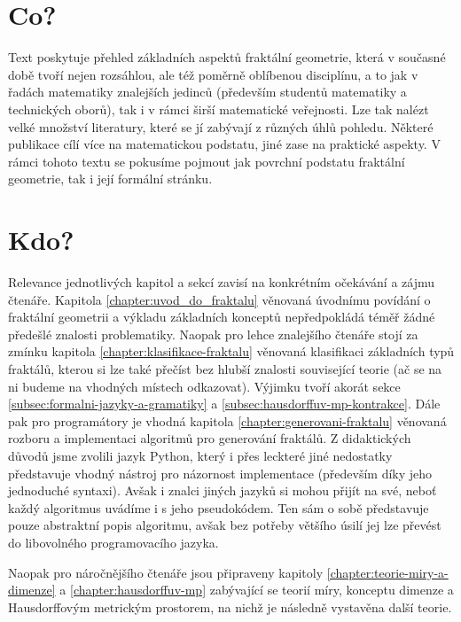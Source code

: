 \label{chapter:predmluva}

\section*{Co?}

Text poskytuje přehled základních aspektů fraktální geometrie, která v současné době tvoří nejen rozsáhlou, ale též poměrně oblíbenou disciplínu, a to jak v řadách matematiky znalejších jedinců (především studentů matematiky a technických oborů), tak i v rámci širší matematické veřejnosti. Lze tak nalézt velké množství literatury, které se jí zabývají z různých úhlů pohledu. Některé publikace cílí více na matematickou podstatu, jiné zase na praktické aspekty. V rámci tohoto textu se pokusíme pojmout jak povrchní podstatu fraktální geometrie, tak i její formální stránku.

\section*{Kdo?}

Relevance jednotlivých kapitol a sekcí zavisí na konkrétním očekávání a zájmu čtenáře. Kapitola \ref{chapter:uvod_do_fraktalu} věnovaná úvodnímu povídání o fraktální geometrii a výkladu základních konceptů nepředpokládá téměř žádné předešlé znalosti problematiky. Naopak pro lehce znalejšího čtenáře stojí za zmínku kapitola \ref{chapter:klasifikace-fraktalu} věnovaná klasifikaci základních typů fraktálů, kterou si lze také přečíst bez hlubší znalosti související teorie (ač se na ni budeme na vhodných místech odkazovat). Výjimku tvoří akorát sekce \ref{subsec:formalni-jazyky-a-gramatiky} a \ref{subsec:hausdorffuv-mp-kontrakce}. Dále pak pro programátory je vhodná kapitola \ref{chapter:generovani-fraktalu} věnovaná rozboru a implementaci algoritmů pro generování fraktálů. Z didaktických důvodů jsme zvolili jazyk Python, který i přes leckteré jiné nedostatky představuje vhodný nástroj pro názornost implementace (především díky jeho jednoduché syntaxi). Avšak i znalci jiných jazyků si mohou přijít na své, neboť každý algoritmus uvádíme i s jeho pseudokódem. Ten sám o sobě představuje pouze abstraktní popis algoritmu, avšak bez potřeby většího úsilí jej lze převést do libovolného programovacího jazyka.

Naopak pro náročnějšího čtenáře jsou připraveny kapitoly \ref{chapter:teorie-miry-a-dimenze} a \ref{chapter:hausdorffuv-mp} zabývající se teorií míry, konceptu dimenze a Hausdorffovým metrickým prostorem, na nichž je následně vystavěna další teorie.

